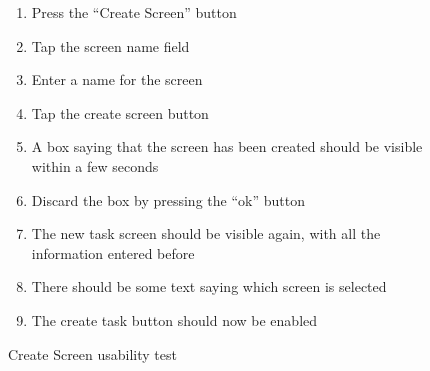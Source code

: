 \begin{figure}[H]
    \begin{enumerate}
        \item Press the “Create Screen” button
        \item Tap the screen name field
        \item Enter a name for the screen
        \item Tap the create screen button
        \item A box saying that the screen has been created should be visible within a few seconds
        \item Discard the box by pressing the “ok” button
        \item The new task screen should be visible again, with all the information entered before
        \item There should be some text saying which screen is selected
        \item The create task button should now be enabled
    \end{enumerate}
    \caption{Create Screen usability test}
    \label{createScreenUsabilityTest}

\end{figure}